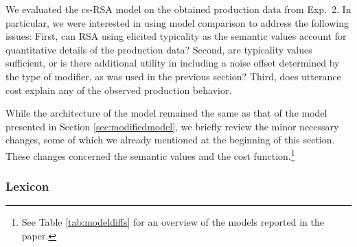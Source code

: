 \documentclass[11pt]{article}
\newcommand{\tableref}[1]{Table \ref{#1}}
\newcommand{\sectionref}[1]{Section \ref{#1}}
\begin{document}
We evaluated the cs-RSA model on the obtained production data from Exp.~2. In particular, we were interested in using model comparison to address the following issues:
First, can RSA using elicited typicality as the semantic values account for quantitative details of the production data?
Second, are typicality values sufficient, or is there additional utility in including a noise offset determined by the type of modifier, as was used in the previous section?
Third, does utterance cost explain any of the observed production behavior. 


While the architecture of the model remained the same as that of the model presented in \sectionref{sec:modifiedmodel}, we briefly review the minor necessary changes, some of which we already mentioned at the beginning of this section. These changes concerned the semantic values and the cost function.\footnote{See \tableref{tab:modeldiffs} for an overview of the models reported in the paper.} 

\subsubsection{Lexicon}
\end{document}
